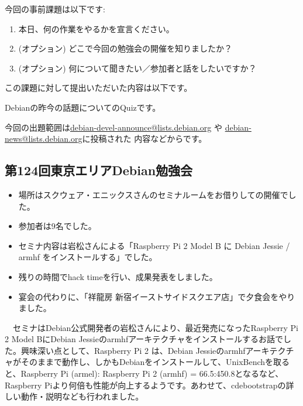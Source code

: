 \documentclass[mingoth,a4paper]{jsarticle}
\begin{document}

今回の事前課題は以下です:
\begin{enumerate}
\item 本日、何の作業をやるかを宣言ください。
\item (オプション) どこで今回の勉強会の開催を知りましたか？
\item (オプション) 何について聞きたい／参加者と話をしたいですか？
\end{enumerate}
この課題に対して提出いただいた内容は以下です。
\begin{multicols}{2}
{\small

}
\end{multicols}


 Debianの昨今の話題についてのQuizです。

今回の出題範囲は\url{debian-devel-announce@lists.debian.org} や \url{debian-news@lists.debian.org}に投稿された
内容などからです。

\begin{multicols}{2}

\end{multicols}


\subsection{第124回東京エリアDebian勉強会}

\begin{itemize}
\item 場所はスクウェア・エニックスさんのセミナルームをお借りしての開催でした。
\item 参加者は9名でした。
\item セミナ内容は岩松さんによる「Raspberry Pi 2 Model B に Debian Jessie / armhf をインストールする」でした。
\item 残りの時間でhack timeを行い、成果発表をしました。
\item 宴会の代わりに、「祥龍房 新宿イーストサイドスクエア店」で夕食会をやりました。
\end{itemize} 

　セミナはDebian公式開発者の岩松さんにより、最近発売になったRaspberry Pi 2 Model BにDebian Jessieのarmhfアーキテクチャをインストールするお話でした。興味深い点として、Raspberry Pi 2 は、Debian Jessieのarmhfアーキテクチャがそのままで動作し、しかもDebianをインストールして、UnixBenchを取ると、Raspberry Pi (armel): Raspberry Pi 2 (armhf) = 66.5:450.8となるなど、Raspberry Piより何倍も性能が向上するようです。あわせて、cdebootstrapの詳しい動作・説明なども行われました。
\end{document}
